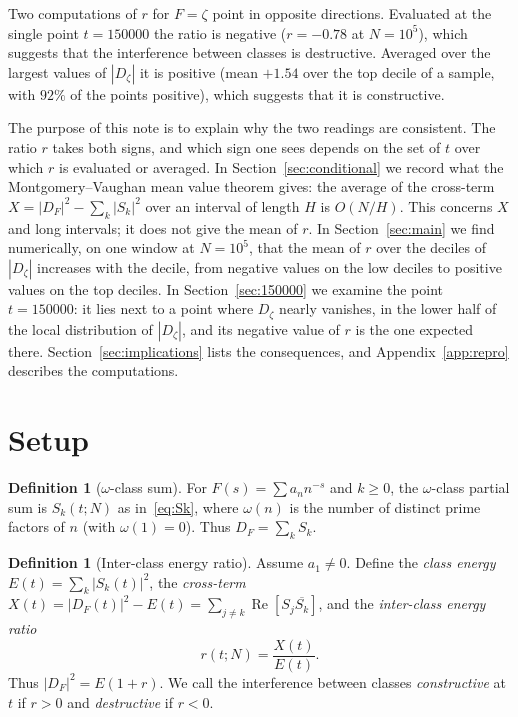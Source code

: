 \documentclass[11pt]{amsart}
\theoremstyle{definition}
\newtheorem{definition}[theorem]{Definition}
\theoremstyle{remark}
\newcommand{\re}{\operatorname{Re}}
\begin{document}
Two computations of $r$ for $F=\zeta$ point in opposite directions.
Evaluated at the single point $t=150000$ the ratio is negative
($r=-0.78$ at $N=10^5$), which suggests that the interference between
classes is destructive. Averaged over the largest values of $|D_\zeta|$
it is positive (mean $+1.54$ over the top decile of a sample, with $92\%$
of the points positive), which suggests that it is constructive.

The purpose of this note is to explain why the two readings are
consistent. The ratio $r$ takes both signs, and which sign one sees
depends on the set of $t$ over which $r$ is evaluated or averaged. In
Section~\ref{sec:conditional} we record what the Montgomery--Vaughan mean
value theorem gives: the average of the cross-term $X=|D_F|^2-\sum_k|S_k|^2$
over an interval of length $H$ is $O(N/H)$. This concerns $X$ and long
intervals; it does not give the mean of $r$. In Section~\ref{sec:main}
we find numerically, on one window at $N=10^5$, that the mean of $r$ over
the deciles of $|D_\zeta|$ increases with the decile, from negative
values on the low deciles to positive values on the top deciles. In
Section~\ref{sec:150000} we examine the point $t=150000$: it lies next
to a point where $D_\zeta$ nearly vanishes, in the lower half of the local distribution of
$|D_\zeta|$, and its negative value of $r$ is the one expected there.
Section~\ref{sec:implications} lists the consequences, and
Appendix~\ref{app:repro} describes the computations.

\section{Setup}
\label{sec:setup}

\begin{definition}[$\omega$-class sum]\label{def:Sk}
For $F(s)=\sum a_n n^{-s}$ and $k\ge0$, the $\omega$-class partial sum is
$S_k(t;N)$ as in~\eqref{eq:Sk}, where $\omega(n)$ is the number of
distinct prime factors of $n$ (with $\omega(1)=0$). Thus
$D_F=\sum_k S_k$.
\end{definition}

\begin{definition}[Inter-class energy ratio]\label{def:r}
Assume $a_1\neq0$. Define the \emph{class energy}
$E(t)=\sum_k|S_k(t)|^2$, the \emph{cross-term}
$X(t)=|D_F(t)|^2-E(t)=\sum_{j\ne k}\re[S_j\overline{S_k}]$,
and the \emph{inter-class energy ratio}
\begin{equation}\label{eq:r}
r(t;N)=\frac{X(t)}{E(t)}.
\end{equation}
Thus $|D_F|^2=E(1+r)$. We call the interference between classes
\emph{constructive} at $t$ if $r>0$ and \emph{destructive} if $r<0$.
\end{definition}
\end{document}

